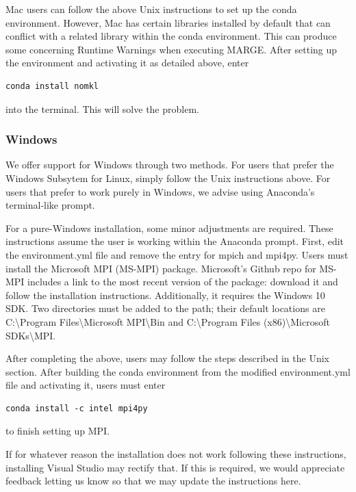 \documentclass[letterpaper, 12pt]{article}
\begin{document}
\noindent Mac users can follow the above Unix instructions to set up the conda 
environment.  However, Mac has certain libraries installed by default that 
can conflict with a related library within the conda environment.  This can 
produce some concerning Runtime Warnings when executing MARGE.  After setting 
up the environment and activating it as detailed above, enter 
\begin{verbatim}
conda install nomkl
\end{verbatim}
\noindent into the terminal.  This will solve the problem.


\subsubsection{Windows}

\noindent We offer support for Windows through two methods.  For users that 
prefer the Windows Subsytem for Linux, simply follow the Unix instructions 
above.  For users that prefer to work purely in Windows, we advise using 
Anaconda's terminal-like prompt.\newline

\noindent For a pure-Windows installation, some minor adjustments are required.
These instructions assume the user is working within the Anaconda prompt.  
First, edit the environment.yml file and remove the entry for mpich and mpi4py. 
Users must install the Microsoft MPI (MS-MPI) package.  Microsoft's Github repo 
for MS-MPI includes a link to the most recent version of the package: download 
it and follow the installation instructions.  Additionally, it requires the 
Windows 10 SDK.  Two directories must be added to the path; their default 
locations are C:{\textbackslash}Program Files{\textbackslash}Microsoft MPI{\textbackslash}Bin and 
C:{\textbackslash}Program Files (x86){\textbackslash}Microsoft SDKs{\textbackslash}MPI. \newline

\noindent After completing the above, users may follow the steps described in the Unix 
section.  After building the conda environment from the modified environment.yml
file and activating it, users must enter
\begin{verbatim}
conda install -c intel mpi4py
\end{verbatim}
\noindent to finish setting up MPI.\newline

\noindent If for whatever reason the installation does not work following these 
instructions, installing Visual Studio may rectify that.  If this is required, 
we would appreciate feedback letting us know so that we may update the 
instructions here. \newline
\end{document}
